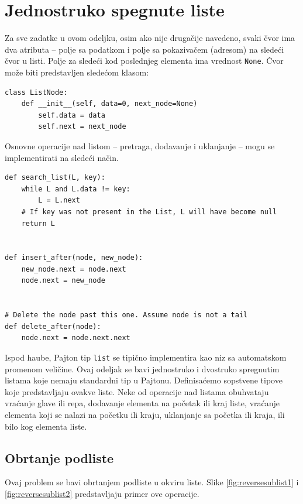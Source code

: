 \documentclass[11pt,a4paper]{article}
\begin{document}
\section{Jednostruko spegnute liste}

Za sve zadatke u ovom odeljku, osim ako nije drugačije navedeno, svaki čvor ima
dva atributa -- polje sa podatkom i polje sa pokazivačem (adresom) na sledeći
čvor u listi. Polje za sledeći kod poslednjeg elementa ima vrednost
\texttt{None}. Čvor može biti predstavljen sledećom klasom:

\begin{verbatim}
class ListNode:
    def __init__(self, data=0, next_node=None)
        self.data = data 
        self.next = next_node  
\end{verbatim}  

Osnovne operacije nad listom -- pretraga, dodavanje i uklanjanje -- mogu se
implementirati na sledeći način.

\begin{verbatim}
def search_list(L, key): 
    while L and L.data != key:
        L = L.next
    # If key was not present in the List, L will have become null 
    return L


def insert_after(node, new_node):
    new_node.next = node.next
    node.next = new_node


# Delete the node past this one. Assume node is not a tail 
def delete_after(node):
    node.next = node.next.next
\end{verbatim}  

Ispod haube, Pajton tip \texttt{list} se tipično implementira kao niz sa
automatskom promenom veličine. Ovaj odeljak se bavi jednostruko i dvostruko
spregnutim listama koje nemaju standardni tip u Pajtonu. Definisaćemo sopstvene
tipove koje predstavljaju ovakve liste. Neke od operacije nad listama obuhvataju
vraćanje glave ili repa, dodavanje elementa na početak ili kraj liste, vraćanje
elementa koji se nalazi na početku ili kraju, uklanjanje sa početka ili kraja,
ili bilo kog elementa liste.

\subsection{Obrtanje podliste}

Ovaj problem se bavi obrtanjem podliste u okviru liste. Slike
\ref{fig:reversesublist1} i \ref{fig:reversesublist2} predstavljaju primer ove
operacije.
\end{document}
